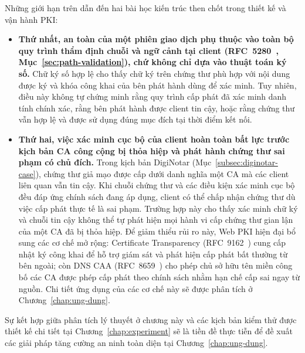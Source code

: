 \pagebreak
Những giới hạn trên dẫn đến hai bài học kiến trúc then chốt trong thiết kế và vận hành PKI:
\begin{itemize}\setlength{\itemsep}{2pt}\setlength{\parskip}{0pt}
    \item \textbf{Thứ nhất, an toàn của một phiên giao dịch phụ thuộc vào toàn bộ quy trình thẩm định chuỗi và ngữ cảnh tại client (RFC~5280~\cite{rfc5280}, Mục~\ref{sec:path-validation}), chứ không chỉ dựa vào thuật toán ký số.} Chữ ký số hợp lệ cho thấy chữ ký trên chứng thư phù hợp với nội dung được ký và khóa công khai của bên phát hành dùng để xác minh. Tuy nhiên, điều này không tự chứng minh rằng quy trình cấp phát đã xác minh danh tính chính xác, rằng bên phát hành được client tin cậy, hoặc rằng chứng thư vẫn hợp lệ và được sử dụng đúng mục đích tại thời điểm kết nối.
    \item \textbf{Thứ hai, việc xác minh cục bộ của client hoàn toàn bất lực trước kịch bản CA công cộng bị thỏa hiệp và phát hành chứng thư sai phạm có chủ đích.} Trong kịch bản DigiNotar (Mục~\ref{subsec:diginotar-case}), chứng thư giả mạo được cấp dưới danh nghĩa một CA mà các client liên quan vẫn tin cậy. Khi chuỗi chứng thư và các điều kiện xác minh cục bộ đều đáp ứng chính sách đang áp dụng, client có thể chấp nhận chứng thư dù việc cấp phát thực tế là sai phạm. Trường hợp này cho thấy xác minh chữ ký và chuỗi tin cậy không thể tự phát hiện mọi hành vi cấp chứng thư gian lận của một CA đã bị thỏa hiệp. Để giảm thiểu rủi ro này, Web PKI hiện đại bổ sung các cơ chế mở rộng: Certificate Transparency (RFC~9162~\cite{rfc9162}) cung cấp nhật ký công khai để hỗ trợ giám sát và phát hiện cấp phát bất thường từ bên ngoài; còn DNS CAA (RFC~8659~\cite{rfc8659}) cho phép chủ sở hữu tên miền công bố các CA được phép cấp phát theo chính sách nhằm hạn chế cấp sai ngay từ nguồn. Chi tiết ứng dụng của các cơ chế này sẽ được phân tích ở Chương~\ref{chap:ung-dung}.
\end{itemize}

Sự kết hợp giữa phân tích lý thuyết ở chương này và các kịch bản kiểm thử được thiết kế chi tiết tại Chương~\ref{chap:experiment} sẽ là tiền đề thực tiễn để đề xuất các giải pháp tăng cường an ninh toàn diện tại Chương~\ref{chap:ung-dung}.

